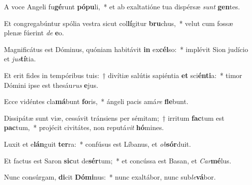 \item A voce Angeli fu\textbf{gé}runt \textbf{pó}\textbf{pu}li,~* et ab exaltatióne tua dispérsæ \textit{sunt} \textbf{gen}tes.
\item Et congregabúntur spólia vestra sicut col\textbf{lí}gitur \textbf{bru}chus,~* velut cum fossæ plenæ fúerint \textit{de} \textbf{e}o.
\item Magnificátus est Dóminus, quóniam habitávit \textbf{in} ex\textbf{cél}so:~* implévit Sion judício et \textit{jus}\textbf{tí}tia.
\item Et erit fides in tempóribus tuis:~† divítiæ salútis sapiéntia \textbf{et} sci\textbf{én}\textbf{ti}a:~* timor Dómini ipse est thesáu\textit{rus} \textbf{e}jus.
\item Ecce vidéntes cla\textbf{má}bunt \textbf{fo}ris,~* ángeli pacis amá\textit{re} \textbf{fle}bunt.
\item Dissipátæ sunt viæ, cessávit tránsiens per sémitam;~† irritum \textbf{fac}tum est \textbf{pac}tum,~* projécit civitátes, non reputá\textit{vit} \textbf{hó}mines.
\item Luxit et e\textbf{lán}guit \textbf{ter}ra:~* confúsus est Líbanus, et \textit{ob}\textbf{sór}duit.
\item Et factus est Saron \textbf{sic}ut de\textbf{sér}tum;~* et concússa est Basan, et \textit{Car}\textbf{mé}lus.
\item Nunc consúrgam, \textbf{di}cit \textbf{Dó}\textbf{mi}nus:~* nunc exaltábor, nunc sub\textit{le}\textbf{vá}bor.
